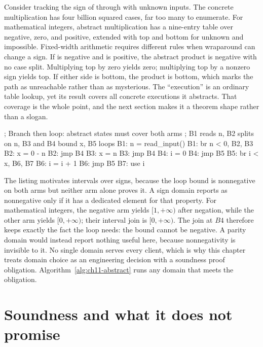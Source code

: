 Consider tracking the sign of  through  with unknown inputs.
The concrete multiplication has four billion squared cases, far too many to enumerate.
For mathematical integers, abstract multiplication has a nine-entry table over negative, zero, and positive, extended with top and bottom for unknown and impossible.
Fixed-width arithmetic requires different rules when wraparound can change a sign.
If  is negative and  is positive, the abstract product is negative with no case split.
Multiplying top by zero yields zero; multiplying top by a nonzero sign yields top.
If either side is bottom, the product is bottom, which marks the path as unreachable rather than as mysterious.
The \enquote{execution} is an ordinary table lookup, yet its result covers all concrete executions it abstracts.
That coverage is the whole point, and the next section makes it a theorem shape rather than a slogan.

\begin{irlisting}
; Branch then loop: abstract states must cover both arms
; B1 reads n, B2 splits on n, B3 and B4 bound x, B5 loops
B1: n = read_input()
B1: br n < 0, B2, B3
B2: x = 0 - n
B2: jmp B4
B3: x = n
B3: jmp B4
B4: i = 0
B4: jmp B5
B5: br i < x, B6, B7
B6: i = i + 1
B6: jmp B5
B7: use i
\end{irlisting}

The listing motivates intervals over signs, because the loop bound  is nonnegative on both arms but neither arm alone proves it.
A sign domain reports  as nonnegative only if it has a dedicated element for that property.
For mathematical integers, the negative arm yields $[1,+\infty)$ after negation, while the other arm yields $[0,+\infty)$; their interval join is $[0,+\infty)$.
The join at $B4$ therefore keeps exactly the fact the loop needs: the bound cannot be negative.
A parity domain would instead report nothing useful here, because nonnegativity is invisible to it.
No single domain serves every client, which is why this chapter treats domain choice as an engineering decision with a soundness proof obligation.
Algorithm~\ref{alg:ch11-abstract} runs any domain that meets the obligation.

\section{Soundness and what it does not promise}
\label{sec:ch11-soundness}

